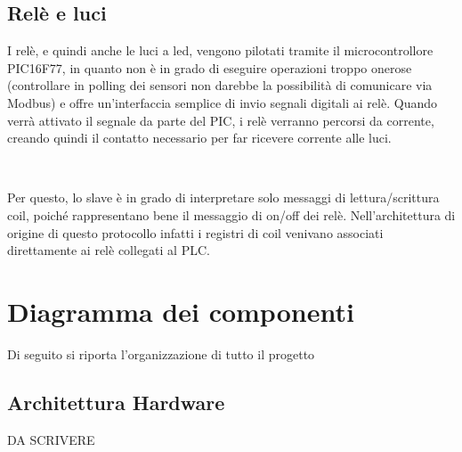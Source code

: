 \documentclass[a4paper,titlepage]{book}
\begin{document}
\subsection{Relè e luci}

I relè, e quindi anche le luci a led, vengono pilotati tramite il microcontrollore PIC16F77, in quanto non è in grado di eseguire operazioni troppo onerose (controllare in polling dei sensori non darebbe la possibilità di comunicare via Modbus) e offre un'interfaccia semplice di invio segnali digitali ai relè. Quando verrà attivato il segnale da parte del PIC, i relè verranno percorsi da corrente, creando quindi il contatto necessario per far ricevere corrente alle luci.

~

Per questo, lo slave è in grado di interpretare solo messaggi di lettura/scrittura coil, poiché rappresentano bene il messaggio di on/off dei relè. Nell'architettura di origine di questo protocollo infatti i registri di coil venivano associati direttamente ai relè collegati al PLC. 


\section{Diagramma dei componenti}

Di seguito si riporta l'organizzazione di tutto il progetto

\subsection{Architettura Hardware}
DA SCRIVERE
\end{document}
